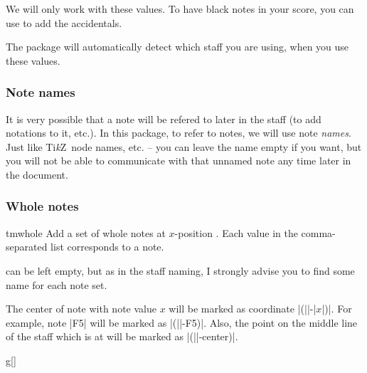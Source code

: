 \documentclass[11pt,a4paper]{ltxdoc}
\newcommand\tikzname{Ti\emph{k}Z}
\begin{document}
We will only work with these values. To have black notes in your score, you can 
use  to add the accidentals.

The package will automatically detect which staff you are using, when you use 
these values.
\subsubsection{Note names}\label{sec:music-notes:commands:note-names}
It is very possible that a note will be refered to later in the staff (to add 
notations to it, etc.). In this package, to refer to notes, we will use note 
\emph{names}. Just like \tikzname\ node names, etc. -- you can leave the name 
empty if you want, but you will not be able to communicate with that unnamed note 
any time later in the document.
\subsubsection{Whole notes}\label{sec:music-notes:commands:whole}
\begin{docCommand}{tmwhole}{}
  Add a set of whole notes at $x$-position . Each value in the 
  comma-separated list  corresponds to a note.

   can be left empty, but as in the staff naming, I strongly advise 
  you to find some name for each note set.

  The center of note with note value $x$ will be marked as coordinate 
  |(||-|$x$|)|. For example, note |F5| will be marked as 
  |(||-F5)|. Also, the point on the middle line of the staff which is 
  at  will be marked as |(||-center)|.
\end{docCommand}
\begin{dispExample}
\begin{tmsinglestaff}
  \begin{tmstaff}{g}[]
  \end{tmstaff}
\end{tmsinglestaff}
\end{dispExample}
\end{document}
